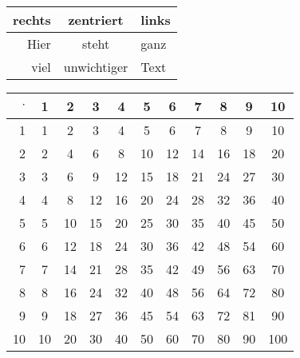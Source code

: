 \documentclass{article}
\begin{document}
\pagestyle{empty}

\begin{center}
	\begin{tabular}{r|c|l}
		\textbf{rechts} & \textbf{zentriert} & \textbf{links} \\ \hline \hline
		Hier & steht & ganz \\
		viel & unwichtiger & Text
	\end{tabular}
\end{center}

\begin{center}
	\begin{tabular}{|r|cccccccccc|} \hline
		$\cdot$ &  1 &  2 &  3 &  4 &  5 &  6 &  7 &  8 &  9 & 10 \\ \hline
		 1 &  1 &  2 &  3 &  4 &  5 &  6 &  7 &  8 &  9 & 10 \\
		 2 &  2 &  4 &  6 &  8 & 10 & 12 & 14 & 16 & 18 & 20 \\
		 3 &  3 &  6 &  9 & 12 & 15 & 18 & 21 & 24 & 27 & 30 \\
		 4 &  4 &  8 & 12 & 16 & 20 & 24 & 28 & 32 & 36 & 40 \\
		 5 &  5 & 10 & 15 & 20 & 25 & 30 & 35 & 40 & 45 & 50 \\
		 6 &  6 & 12 & 18 & 24 & 30 & 36 & 42 & 48 & 54 & 60 \\
		 7 &  7 & 14 & 21 & 28 & 35 & 42 & 49 & 56 & 63 & 70 \\
		 8 &  8 & 16 & 24 & 32 & 40 & 48 & 56 & 64 & 72 & 80 \\
		 9 &  9 & 18 & 27 & 36 & 45 & 54 & 63 & 72 & 81 & 90 \\
		10 & 10 & 20 & 30 & 40 & 50 & 60 & 70 & 80 & 90 & 100 \\
		\hline
	\end{tabular}
\end{center}
\end{document}
